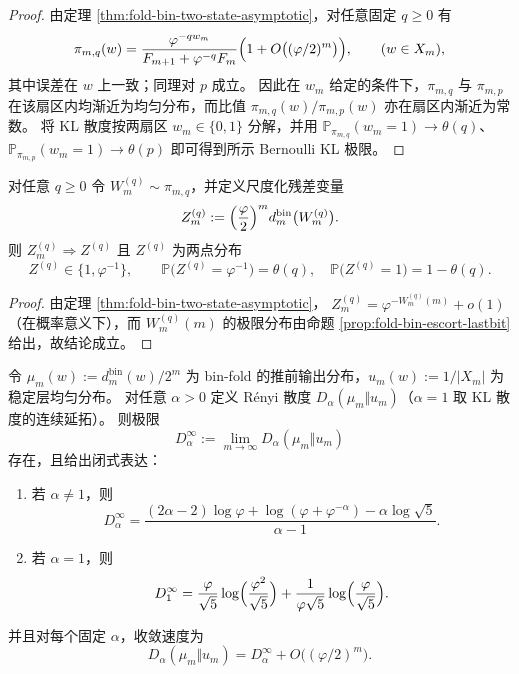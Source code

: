 \begin{proof}
由定理 \ref{thm:fold-bin-two-state-asymptotic}，对任意固定 \(q\ge 0\) 有
\[
\pi_{m,q}(w)=\frac{\varphi^{-qw_m}}{F_{m+1}+\varphi^{-q}F_m}\Bigl(1+O\bigl((\varphi/2)^m\bigr)\Bigr),
\qquad (w\in X_m),
\]
其中误差在 \(w\) 上一致；同理对 \(p\) 成立。
因此在 \(w_m\) 给定的条件下，\(\pi_{m,q}\) 与 \(\pi_{m,p}\) 在该扇区内均渐近为均匀分布，而比值 \(\pi_{m,q}(w)/\pi_{m,p}(w)\) 亦在扇区内渐近为常数。
将 KL 散度按两扇区 \(w_m\in\{0,1\}\) 分解，并用
\(\mathbb{P}_{\pi_{m,q}}(w_m=1)\to \theta(q)\)、\(\mathbb{P}_{\pi_{m,p}}(w_m=1)\to \theta(p)\)
即可得到所示 Bernoulli KL 极限。
\end{proof}

\begin{corollary}\label{cor:fold-bin-escort-two-scale-residual}
对任意 \(q\ge 0\) 令 \(W^{(q)}_m\sim\pi_{m,q}\)，并定义尺度化残差变量
\[
Z^{(q)}_m:=\Bigl(\frac{\varphi}{2}\Bigr)^m d^{\mathrm{bin}}_m\bigl(W^{(q)}_m\bigr).
\]
则 \(Z^{(q)}_m\Rightarrow Z^{(q)}\) 且 \(Z^{(q)}\) 为两点分布
\[
Z^{(q)}\in\{1,\varphi^{-1}\},
\qquad
\mathbb{P}\bigl(Z^{(q)}=\varphi^{-1}\bigr)=\theta(q),
\quad
\mathbb{P}\bigl(Z^{(q)}=1\bigr)=1-\theta(q).
\]
\end{corollary}

\begin{proof}
由定理 \ref{thm:fold-bin-two-state-asymptotic}，
\(
Z^{(q)}_m=\varphi^{-W^{(q)}_m(m)}+o(1)
\)
（在概率意义下），而 \(W^{(q)}_m(m)\) 的极限分布由命题 \ref{prop:fold-bin-escort-lastbit} 给出，故结论成立。
\end{proof}

\begin{theorem}\label{thm:fold-bin-renyi-divergence-limit}
令 \(\mu_m(w):=d^{\mathrm{bin}}_m(w)/2^m\) 为 bin-fold 的推前输出分布，\(u_m(w):=1/|X_m|\) 为稳定层均匀分布。
对任意 \(\alpha>0\) 定义 Rényi 散度 \(D_\alpha(\mu_m\Vert u_m)\)（\(\alpha=1\) 取 KL 散度的连续延拓）。
则极限
\[
D_\alpha^\infty:=\lim_{m\to\infty}D_\alpha(\mu_m\Vert u_m)
\]
存在，且给出闭式表达：
\begin{enumerate}
  \item 若 \(\alpha\neq 1\)，则
  \[
  D_\alpha^\infty=\frac{(2\alpha-2)\log\varphi+\log(\varphi+\varphi^{-\alpha})-\alpha\log\sqrt{5}}{\alpha-1}.
  \]
  \item 若 \(\alpha=1\)，则
  \[
  D_1^\infty=\frac{\varphi}{\sqrt5}\log\Bigl(\frac{\varphi^2}{\sqrt5}\Bigr)+\frac{1}{\varphi\sqrt5}\log\Bigl(\frac{\varphi}{\sqrt5}\Bigr).
  \]
\end{enumerate}
并且对每个固定 \(\alpha\)，收敛速度为
\[
D_\alpha(\mu_m\Vert u_m)=D_\alpha^\infty+O\bigl((\varphi/2)^m\bigr).
\]
\end{theorem}

